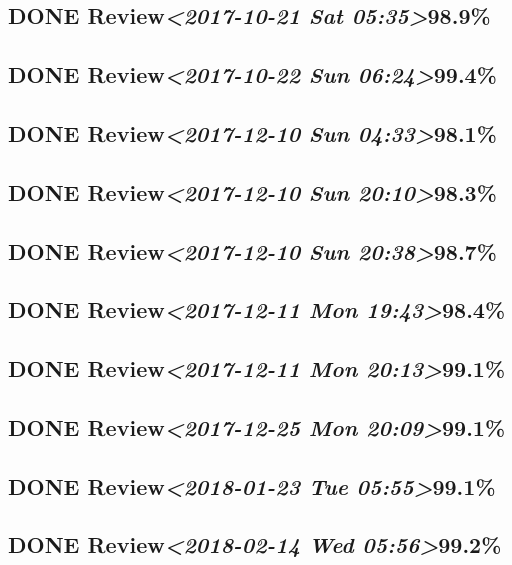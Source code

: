 \documentclass[11pt]{ctexart}
\begin{document}
\subsection{{\bfseries\sffamily DONE} Review\textit{<2017-10-21 Sat 05:35>}98.9\%}
\label{sec:org0486c91}
\subsection{{\bfseries\sffamily DONE} Review\textit{<2017-10-22 Sun 06:24>}99.4\%}
\label{sec:org47ca9a4}

\subsection{{\bfseries\sffamily DONE} Review\textit{<2017-12-10 Sun 04:33>}98.1\%}
\label{sec:orgd2066a0}
\subsection{{\bfseries\sffamily DONE} Review\textit{<2017-12-10 Sun 20:10>}98.3\%}
\label{sec:org4e4fb8b}
\subsection{{\bfseries\sffamily DONE} Review\textit{<2017-12-10 Sun 20:38>}98.7\%}
\label{sec:org1d694a5}
\subsection{{\bfseries\sffamily DONE} Review\textit{<2017-12-11 Mon 19:43>}98.4\%}
\label{sec:org47c5d2f}
\subsection{{\bfseries\sffamily DONE} Review\textit{<2017-12-11 Mon 20:13>}99.1\%}
\label{sec:org70b6784}
\subsection{{\bfseries\sffamily DONE} Review\textit{<2017-12-25 Mon 20:09>}99.1\%}
\label{sec:orgf8c3d24}
\subsection{{\bfseries\sffamily DONE} Review\textit{<2018-01-23 Tue 05:55>}99.1\%}
\label{sec:orgf217ae0}
\subsection{{\bfseries\sffamily DONE} Review\textit{<2018-02-14 Wed 05:56>}99.2\%}
\label{sec:org053a287}
\end{document}
